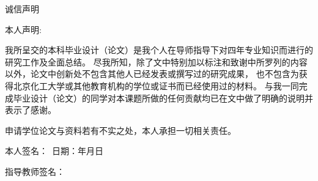 \begin{center}
\heiti 诚信声明
\end{center}
\vspace*{2\baselineskip}
\noindent 本人声明:\par
\vspace*{\baselineskip}
我所呈交的本科毕业设计（论文）是我个人在导师指导下对四年专业知识而进行的研究工作及全面总结。
尽我所知，除了文中特别加以标注和致谢中所罗列的内容以外，论文中创新处不包含其他人已经发表或撰写过的研究成果，
也不包含为获得北京化工大学或其他教育机构的学位或证书而已经使用过的材料。
与我一同完成毕业设计（论文）的同学对本课题所做的任何贡献均已在文中做了明确的说明并表示了感谢。\par
申请学位论文与资料若有不实之处，本人承担一切相关责任。
\vspace*{\baselineskip}
\par
本人签名：~\underline{\hspace{9em}}\hspace{4em}日期：\hspace{2.5em}年\hspace{2.5em}月\hspace{2.5em}日\par
指导教师签名：~\underline{\hspace{7em}}